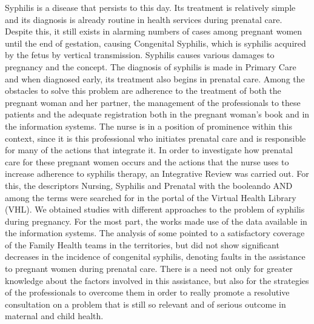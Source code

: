Syphilis is a disease that persists to this day. Its treatment is relatively simple and its diagnosis is already routine in health services during prenatal care. Despite this, it still exists in alarming numbers of cases among pregnant women until the end of gestation, causing Congenital Syphilis, which is syphilis acquired by the fetus by vertical transmission. Syphilis causes various damages to pregnancy and the concept. The diagnosis of syphilis is made in Primary Care and when diagnosed early, its treatment also begins in prenatal care. Among the obstacles to solve this problem are adherence to the treatment of both the pregnant woman and her partner, the management of the professionals to these patients and the adequate registration both in the pregnant woman's book and in the information systems. The nurse is in a position of prominence within this context, since it is this professional who initiates prenatal care and is responsible for many of the actions that integrate it. In order to investigate how prenatal care for these pregnant women occurs and the actions that the nurse uses to increase adherence to syphilis therapy, an Integrative Review was carried out. For this, the descriptors Nursing, Syphilis and Prenatal with the booleando AND among the terms were searched for in the portal of the Virtual Health Library (VHL). We obtained studies with different approaches to the problem of syphilis during pregnancy. For the most part, the works made use of the data available in the information systems. The analysis of some pointed to a satisfactory coverage of the Family Health teams in the territories, but did not show significant decreases in the incidence of congenital syphilis, denoting faults in the assistance to pregnant women during prenatal care. There is a need not only for greater knowledge about the factors involved in this assistance, but also for the strategies of the professionals to overcome them in order to really promote a resolutive consultation on a problem that is still so relevant and of serious outcome in maternal and child health.

